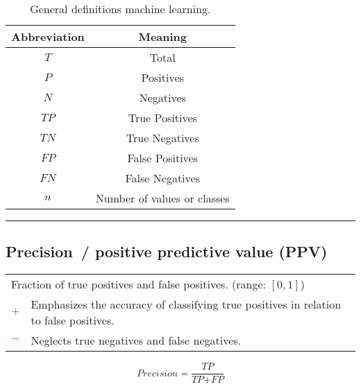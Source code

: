 \documentclass{article}
\begin{document}
\begin{table}[H]
	\centering

	\begin{tabular}{|c|c|}
		\hline
		Abbreviation & Meaning \\
		\hline
		\hline
		$\textit{T}$  & Total                       \\
		$\textit{P}$  & Positives                   \\
		$\textit{N}$  & Negatives                   \\
		$\textit{TP}$ & True Positives              \\
		$\textit{TN}$ & True Negatives              \\
		$\textit{FP}$ & False Positives             \\
		$\textit{FN}$ & False Negatives             \\
		$n$           & Number of values or classes \\
		\hline
	\end{tabular}

	\caption{General definitions machine learning.}
	\label{table:ML_general}
\end{table}

\vspace{1cm}
\hrule




\clearpage




\subsection[Precision~/ positive predictive value (PPV)]{Precision~/ positive predictive value (PPV) \cite{altman1994statistics, fletcher2019clinical}}

\begin{table}[H]\centering
	\begin{tabular}{m{}m{}}
		\multicolumn{2}{m{0.95\textwidth}}{Fraction of true positives and false positives. (range: $[0, 1]$)} \\
		\textcolor{Green}{$+$} & Emphasizes the accuracy of classifying true positives in relation to false positives. \\
		\textcolor{Red}{$-$}   & Neglects true negatives and false negatives.
	\end{tabular}
\end{table}

\begin{equation}
	\textit{Precision} = \dfrac{\textit{TP}}{\textit{TP} + \textit{FP}}
%
	\label{equation:precision}
\end{equation}
\end{document}
